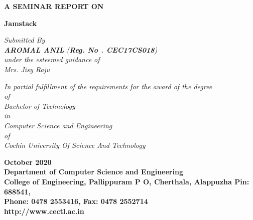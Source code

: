 \documentclass[12pt,a4paper,oneside]{report}
\begin{document}
\begin{titlepage}
\begin{center}

\large{\textbf{A SEMINAR REPORT ON}}\\
\begin{singlespace}
\LARGE{\textbf{Jamstack}}\\
\end{singlespace}


\Large{\textit{Submitted By }}\\
\Large{\textit{\textbf{AROMAL ANIL}     (\textbf{Reg. No . CEC17CS018})}}\\
\Large{\textit{\textit{under the esteemed guidance of}}}\\
\Large{\textit{Mrs. Jisy Raju}}\\
\begin{singlespace}
\large{\textit{In partial fulfillment of the requirements for the award of the degree}\\
\large{ \textit{of}}\\
\large{\textit{Bachelor of Technology} }\\
\large{\textit{in}}\\
\large{\textit{Computer Science and Engineering}}\\
\large{\textit{of}}\\
\large{\textit{Cochin University Of Science And Technology}}}\\
\end{singlespace}
\begin{figure}[h]
\begin{center}
\end{center}
\end{figure}
\begin{singlespace}

\Large{\textbf{October 2020\\Department of Computer Science and Engineering\\College of Engineering, Pallippuram P O, Cherthala, Alappuzha Pin: 688541, \\Phone: 0478 2553416, Fax: 0478 2552714\\http://www.cectl.ac.in}}
\end{singlespace}
\end{center}
\end{titlepage}
\end{document}

